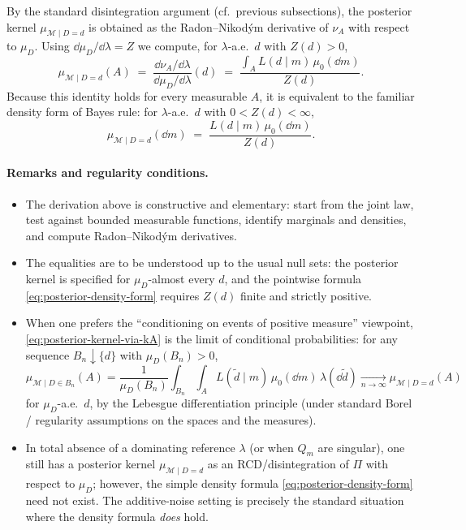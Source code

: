 \documentclass[11pt]{article}
\theoremstyle{remark}
\newcommand{\modelspace}{\mathcal{M}}
\begin{document}
By the standard disintegration argument (cf.\ previous subsections), the
posterior kernel \(\mu_{\modelspace\mid D=d}\) is obtained as the
Radon--Nikod\'ym derivative of \(\nu_A\) with respect to \(\mu_D\). Using
\(\dd\mu_D/\dd\lambda = Z\) we compute, for \(\lambda\)-a.e.\ \(d\) with
\(Z(d)>0\),
\begin{equation}\label{eq:posterior-kernel-via-kA}
\mu_{\modelspace\mid D=d}(A)
\;=\;
\frac{\dd\nu_A/\dd\lambda}{\dd\mu_D/\dd\lambda}(d)
\;=\;
\frac{\int_A L(d\mid m)\,\mu_0(\dd m)}{Z(d)}.
\end{equation}
Because this identity holds for every measurable \(A\), it is equivalent to
the familiar density form of Bayes rule: for \(\lambda\)-a.e.\ \(d\) with
\(0<Z(d)<\infty\),
\begin{equation}\label{eq:posterior-density-form}
\mu_{\modelspace\mid D=d}(\dd m)
\;=\;
\frac{L(d\mid m)\,\mu_0(\dd m)}{Z(d)}.
\end{equation}

\paragraph{Remarks and regularity conditions.}
\begin{itemize}
  \item The derivation above is constructive and elementary: start from the
    joint law, test against bounded measurable functions, identify marginals
    and densities, and compute Radon--Nikod\'ym derivatives.
  \item The equalities are to be understood up to the usual null sets: the
    posterior kernel is specified for \(\mu_D\)-almost every \(d\), and the
    pointwise formula \eqref{eq:posterior-density-form} requires \(Z(d)\)
    finite and strictly positive.
  \item When one prefers the ``conditioning on events of positive measure''
    viewpoint, \eqref{eq:posterior-kernel-via-kA} is the limit of conditional
    probabilities: for any sequence \(B_n\downarrow\{d\}\) with
    \(\mu_D(B_n)>0\),
    \[
    \mu_{\modelspace\mid D\in B_n}(A)
    =
    \frac{1}{\mu_D(B_n)}\int_{B_n}\int_A L(\tilde d\mid m)\,\mu_0(\dd m)\,\lambda(\dd \tilde d)
    \xrightarrow[n\to\infty]{} \mu_{\modelspace\mid D=d}(A)
    \]
    for \(\mu_D\)-a.e.\ \(d\), by the Lebesgue differentiation principle (under
    standard Borel / regularity assumptions on the spaces and the measures).
  \item In total absence of a dominating reference \(\lambda\) (or when
    \(Q_m\) are singular), one still has a posterior kernel \(\mu_{\modelspace\mid D=d}\)
    as an RCD/disintegration of \(\Pi\) with respect to \(\mu_D\); however,
    the simple density formula \eqref{eq:posterior-density-form} need not
    exist. The additive-noise setting is precisely the standard situation
    where the density formula \emph{does} hold.
\end{itemize}
\end{document}
